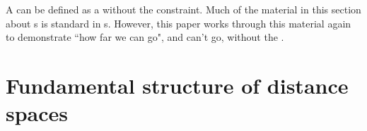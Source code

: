 
A   can be defined as a  
without the  constraint.
Much of the material in this section about s is
standard in s.
However, this paper works through this material again to demonstrate ``how far we can go", and can't go, 
without the .

\section{Fundamental structure of distance spaces}
